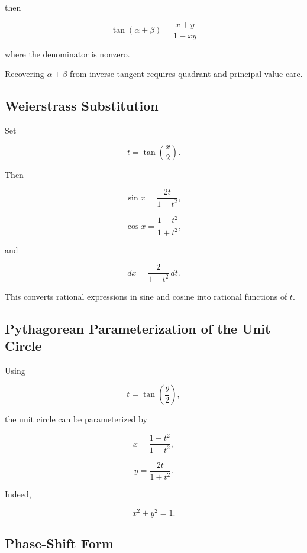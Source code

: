 then

\[
\boxed{
\tan(\alpha+\beta)
=
\frac{x+y}{1-xy}
}
\]

where the denominator is nonzero.

Recovering \(\alpha+\beta\) from inverse tangent requires quadrant and
principal-value care.

\subsection{Weierstrass Substitution}
\label{subsec:weierstrass-substitution-reference}

Set

\[
\boxed{
t
=
\tan\left(\frac{x}{2}\right).
}
\]

Then

\[
\boxed{
\sin x
=
\frac{2t}{1+t^2},
}
\]

\[
\boxed{
\cos x
=
\frac{1-t^2}{1+t^2},
}
\]

and

\[
\boxed{
dx
=
\frac{2}{1+t^2}\,dt.
}
\]

This converts rational expressions in sine and cosine into rational
functions of \(t\).

\subsection{Pythagorean Parameterization of the Unit Circle}
\label{subsec:unit-circle-rational-parameterization}

Using

\[
t
=
\tan\left(\frac{\theta}{2}\right),
\]

the unit circle can be parameterized by

\[
\boxed{
x
=
\frac{1-t^2}{1+t^2},
}
\]

\[
\boxed{
y
=
\frac{2t}{1+t^2}.
}
\]

Indeed,

\[
\boxed{
x^2+y^2=1.
}
\]

\subsection{Phase-Shift Form}
\label{subsec:phase-shift-amplitude-form}

